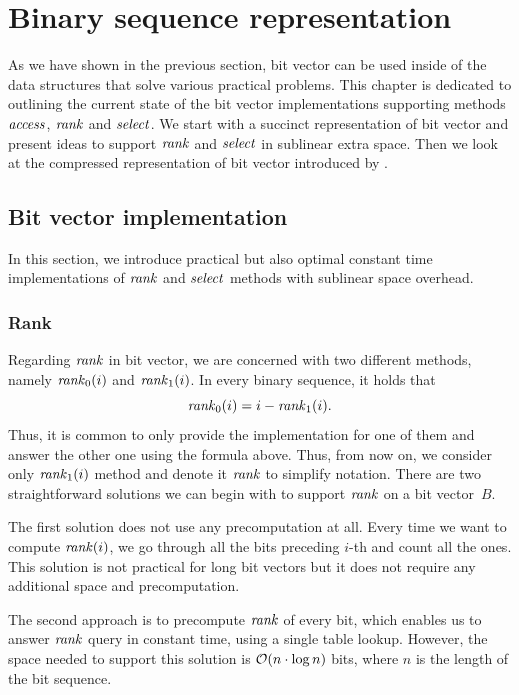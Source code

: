 \chapter{Binary sequence representation}
\label{kap:kap2}

As we have shown in the previous section, bit vector can be used inside of the data structures
that solve various practical problems. This chapter is dedicated to outlining the current state
of the bit vector implementations supporting methods $\mathit{access}$, $\mathit{rank}$ and $\mathit{select}$. We start
with a succinct representation of bit vector and present ideas to support $\mathit{rank}$ and $\mathit{select}$
in sublinear extra space. Then we look at the compressed representation of bit vector introduced
by \cite{raman2007succinct}.

\section{Bit vector implementation}

In this section, we introduce practical but also optimal constant time implementations of
$\mathit{rank}$ and $\mathit{select}$ methods with sublinear space overhead.

\subsection{Rank}
\label{section:rank}

Regarding $\mathit{rank}$ in bit vector, we are concerned with two different methods, namely $\mathit{rank}_0(i)$
and $\mathit{rank}_1(i)$. In every binary sequence, it holds that $$\mathit{rank}_0(i) = i - \mathit{rank}_1(i).$$
Thus, it is common to only provide the implementation for one of them and answer the other one
using the formula above. Thus, from now on, we consider only $\mathit{rank}_1(i)$ method and denote
it $\mathit{rank}$ to simplify notation. There are two straightforward solutions we can begin with to
support $\mathit{rank}$ on a bit vector~$B$.

The first solution does not use any precomputation at all. Every time we want
to compute $\mathit{rank}(i)$, we go through all the bits preceding $i$-th and count all
the ones. This solution is not practical for long bit vectors but it does not require
any additional space and precomputation.

The second approach is to precompute $\mathit{rank}$ of every bit, which enables us to answer
$\mathit{rank}$ query in constant time, using a single table lookup. However, the space needed to
support this solution is $\mathcal{O}(n\cdot\log n)$ bits, where $n$ is the length of the
bit sequence.


